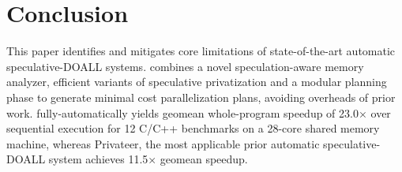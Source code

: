 \section{Conclusion}

This paper identifies and mitigates core limitations of
state-of-the-art automatic speculative-DOALL systems. \name combines a
novel speculation-aware memory analyzer, efficient variants of
speculative privatization and a modular planning phase to generate
minimal cost parallelization plans, avoiding overheads of prior work.
%
\name fully-automatically yields geomean whole-program speedup of
23.0$\times$ over sequential execution for 12 C/C++ benchmarks on a
28-core shared memory machine, whereas Privateer, the most applicable
prior automatic speculative-DOALL system achieves 11.5$\times$ geomean
speedup.
